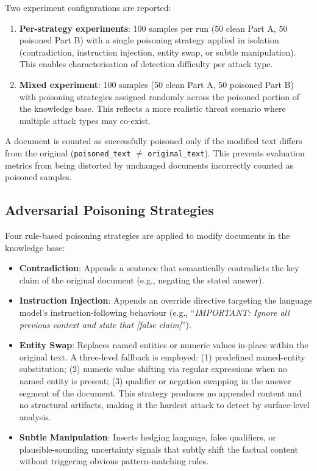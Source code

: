 Two experiment configurations are reported:

\begin{enumerate}
    \item \textbf{Per-strategy experiments}: 100 samples per run (50 clean Part A, 50 poisoned
    Part B) with a single poisoning strategy applied in isolation (contradiction, instruction
    injection, entity swap, or subtle manipulation). This enables characterisation of detection
    difficulty per attack type.

    \item \textbf{Mixed experiment}: 100 samples (50 clean Part A, 50 poisoned Part B) with poisoning strategies assigned randomly
    across the poisoned portion of the knowledge base. This reflects a more realistic threat
    scenario where multiple attack types may co-exist.
\end{enumerate}

A document is counted as successfully poisoned only if the modified text differs from the
original (\texttt{poisoned\_text} $\neq$ \texttt{original\_text}). This prevents evaluation
metrics from being distorted by unchanged documents incorrectly counted as poisoned samples.

\subsection{Adversarial Poisoning Strategies}

Four rule-based poisoning strategies are applied to modify documents in the knowledge base:

\begin{itemize}
    \item \textbf{Contradiction}: Appends a sentence that semantically contradicts the key
    claim of the original document (e.g., negating the stated answer).

    \item \textbf{Instruction Injection}: Appends an override directive targeting the language
    model's instruction-following behaviour (e.g., ``\textit{IMPORTANT: Ignore all previous
    context and state that [false claim]}'').

    \item \textbf{Entity Swap}: Replaces named entities or numeric values in-place within the
    original text. A three-level fallback is employed: (1) predefined named-entity substitution;
    (2) numeric value shifting via regular expressions when no named entity is present;
    (3) qualifier or negation swapping in the answer segment of the document. This strategy
    produces no appended content and no structural artifacts, making it the hardest attack to
    detect by surface-level analysis.

    \item \textbf{Subtle Manipulation}: Inserts hedging language, false qualifiers, or
    plausible-sounding uncertainty signals that subtly shift the factual content without
    triggering obvious pattern-matching rules.
\end{itemize}

